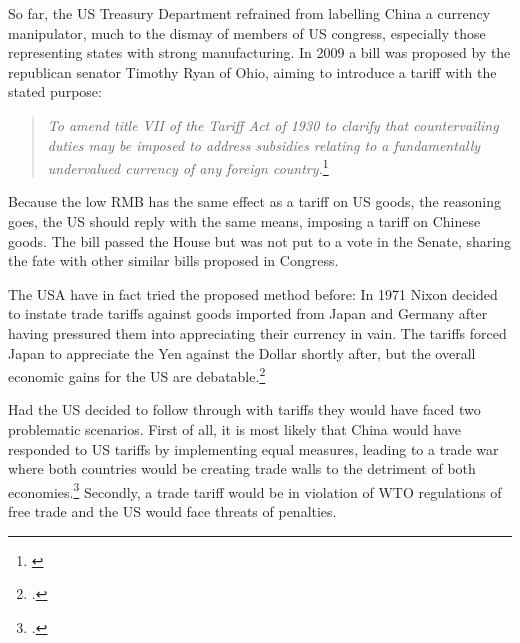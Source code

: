 
So far, the US Treasury Department refrained from labelling China a currency manipulator, much to the dismay of members of US congress, especially those representing states with strong manufacturing.
In 2009 a bill was proposed by the republican senator Timothy Ryan of 
Ohio, aiming to introduce a tariff with the stated purpose:
\begin{quotation}
\textit{To amend title VII of the Tariff Act of 1930 to clarify that 
countervailing duties may be imposed to address subsidies relating to a 
fundamentally undervalued currency of any foreign 
country.}\footnote{\cite{Ryan2009}}
\end{quotation}Because the low RMB has the same effect as a tariff on US 
goods, the reasoning goes, the US should reply with the same means, 
imposing a tariff on Chinese goods. The bill passed the House but was 
not put to a vote in the Senate, sharing the fate with other similar 
bills proposed in Congress. 

The USA have in fact tried the proposed method before: In 1971 Nixon decided to instate trade 
tariffs against goods imported from Japan and Germany after having 
pressured them into appreciating their currency in vain. The tariffs 
forced Japan to appreciate the Yen against the Dollar shortly after, but 
the overall economic gains for the US are debatable.\footnote{\cite{kuroda2004}.} 

Had the US decided to follow through with tariffs they would have faced 
two problematic scenarios. First of all, it is most likely that China 
would have responded to US tariffs by implementing equal measures, 
leading to a trade war where both countries would be creating trade 
walls to the detriment of both economies.\footnote{\cite{Levy2010}.} 
Secondly, a trade tariff would be in violation of WTO regulations of 
free trade and the US would face threats of penalties. 


